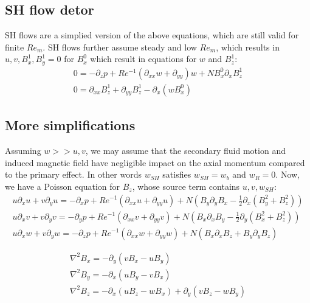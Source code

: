\documentclass[11pt]{article}
\newcommand{\PD}{\partial}
\begin{document}
\subsection{SH flow detor}
SH flows are a simplied version of the above equations, which are still valid for finite $Re_m$. SH flows further assume steady and low $Re_m$, which results in $u,v,B_x^1,B_y^1 = 0$ for $B_x^0$ which result in equations for $w$ and $B_z^1$:
\begin{equation}\begin{aligned}
0=-\PD_z p+Re^{-1}(\PD_{xx} w+\PD_{yy}) w+N B_x^0\PD_x B_z^1 \\
0=\PD_{xx}B_z^1+\PD_{yy}B_z^1 - \PD_x (w B_x^0)
\end{aligned} \end{equation}

\subsection{More simplifications}


Assuming $w>>u,v$, we may assume that the secondary fluid motion and induced magnetic field have negligible impact on the axial momentum compared to the primary effect. In other words $w_{SH}$ satisfies $w_{SH} = w_b$ and $w_R = 0$. Now, we have a Poisson equation for $B_z$, whose source term contains $u,v,w_{SH}$:
\begin{equation}\begin{aligned}
u\PD_x u+v\PD_y u=-\PD_x p+Re^{-1}(\PD_{xx} u+\PD_{yy} u)+N(B_y\PD_y B_x - \tfrac{1}{2} \PD_x (B_y^2+B_z^2)) \\
u\PD_x v+v\PD_y v=-\PD_y p+Re^{-1}(\PD_{xx} v+\PD_{yy} v)+N(B_x\PD_x B_y - \tfrac{1}{2} \PD_y (B_x^2+B_z^2)) \\
u\PD_x w+v\PD_y w=-\PD_z p+Re^{-1}(\PD_{xx} w+\PD_{yy} w)+N(B_x\PD_x B_z + B_y\PD_y B_z)
\end{aligned} \end{equation}

\begin{equation}\begin{aligned}
\nabla^2 B_x = - \PD_y (v B_x - u B_y) \\
\nabla^2 B_y = - \PD_x (u B_y - v B_x) \\
\nabla^2 B_z = - \PD_x (u B_z - w B_x) + \PD_y (v B_z - w B_y)
\end{aligned} \end{equation}
\end{document}
